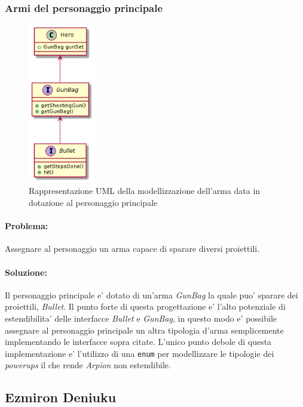 \documentclass[a4paper,12pt]{report}
\begin{document}
\newpage
\subsubsection{Armi del personaggio principale}
    \begin{figure}[H]
    \centering
    \includegraphics[height=7cm]{img/gunSet2.png}
    \caption{Rappresentazione UML della modellizzazione dell'arma data in dotazione al personaggio principale}
\end{figure}

\paragraph{Problema:} Assegnare al personaggio un arma capace di sparare diversi proiettili.

\paragraph{Soluzione:} Il personaggio principale e' dotato di un'arma \emph{GunBag} la quale puo' sparare dei proiettili, \emph{Bullet}. Il punto forte di questa progettazione e' l'alto potenziale di estendibilita' delle interfacce \emph{Bullet} e \emph{GunBag}, in questo modo e' possibile assegnare al personaggio principale un altra tipologia d'arma semplicemente implementando le interfacce sopra citate. L'unico punto debole di questa implementazione e' l'utilizzo di una \texttt{enum} per modellizzare le tipologie dei \emph{powerups} il che rende \emph{Arpion} non estendibile.

\newpage
\subsection{Ezmiron Deniuku}
\end{document}
